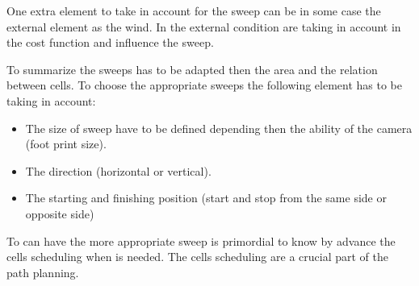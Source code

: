 	One extra element to take in account for the sweep can be in some case the external element as the wind. In \citep{215*lee2010,190*hsu2014}  %
	the external condition are taking in account in the cost function and influence the sweep.
	
	
	To summarize the sweeps has to be adapted then the area and the relation between cells. To choose the appropriate sweeps the following element has to be taking in account:
	\begin{itemize}
		\item The size of sweep  have to be defined depending then the ability of the camera (foot print size).
		\item The direction (horizontal or vertical).
		\item The  starting and finishing  position (start and stop from the same side or opposite side)
	\end{itemize}
To  can have the more appropriate sweep is primordial to know by advance  the cells scheduling when is needed. The cells scheduling are a crucial part of the path planning.

	
	 

	 
	
